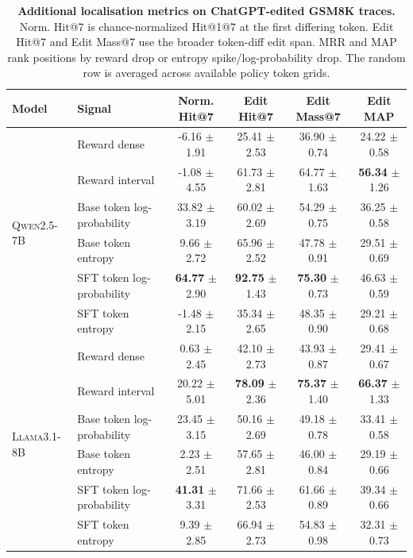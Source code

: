 \begin{table}[t]
\centering
\small
\setlength{\tabcolsep}{4pt}
\caption{\textbf{Additional localisation metrics on ChatGPT-edited GSM8K traces.} Norm. Hit@7 is chance-normalized Hit@1@7 at the first differing token. Edit Hit@7 and Edit Mass@7 use the broader token-diff edit span. MRR and MAP rank positions by reward drop or entropy spike/log-probability drop. The random row is averaged across available policy token grids.}
\label{tab:localisation_chatgpt_step_extra_metrics}
\begin{tabular}{llcccc}
\toprule
\textbf{Model} & \textbf{Signal} & \textbf{Norm. Hit@7} & \textbf{Edit Hit@7} & \textbf{Edit Mass@7} & \textbf{Edit MAP} \\
\midrule
\multirow{6}{*}{\textsc{Qwen2.5-7B}} & Reward dense & -6.16 $\pm$ 1.91 & 25.41 $\pm$ 2.53 & 36.90 $\pm$ 0.74 & 24.22 $\pm$ 0.58 \\
 & Reward interval & -1.08 $\pm$ 4.55 & 61.73 $\pm$ 2.81 & 64.77 $\pm$ 1.63 & \textbf{56.34} $\pm$ 1.26 \\
 & Base token log-probability & 33.82 $\pm$ 3.19 & 60.02 $\pm$ 2.69 & 54.29 $\pm$ 0.75 & 36.25 $\pm$ 0.58 \\
 & Base token entropy & 9.66 $\pm$ 2.72 & 65.96 $\pm$ 2.52 & 47.78 $\pm$ 0.91 & 29.51 $\pm$ 0.69 \\
 & SFT token log-probability & \textbf{64.77} $\pm$ 2.90 & \textbf{92.75} $\pm$ 1.43 & \textbf{75.30} $\pm$ 0.73 & 46.63 $\pm$ 0.59 \\
 & SFT token entropy & -1.48 $\pm$ 2.15 & 35.34 $\pm$ 2.65 & 48.35 $\pm$ 0.90 & 29.21 $\pm$ 0.68 \\
\midrule
\multirow{6}{*}{\textsc{Llama3.1-8B}} & Reward dense & 0.63 $\pm$ 2.45 & 42.10 $\pm$ 2.73 & 43.93 $\pm$ 0.87 & 29.41 $\pm$ 0.67 \\
 & Reward interval & 20.22 $\pm$ 5.01 & \textbf{78.09} $\pm$ 2.36 & \textbf{75.37} $\pm$ 1.40 & \textbf{66.37} $\pm$ 1.33 \\
 & Base token log-probability & 23.45 $\pm$ 3.15 & 50.16 $\pm$ 2.69 & 49.18 $\pm$ 0.78 & 33.41 $\pm$ 0.58 \\
 & Base token entropy & 2.23 $\pm$ 2.51 & 57.65 $\pm$ 2.81 & 46.00 $\pm$ 0.84 & 29.19 $\pm$ 0.66 \\
 & SFT token log-probability & \textbf{41.31} $\pm$ 3.31 & 71.66 $\pm$ 2.53 & 61.66 $\pm$ 0.89 & 39.34 $\pm$ 0.66 \\
 & SFT token entropy & 9.39 $\pm$ 2.85 & 66.94 $\pm$ 2.73 & 54.83 $\pm$ 0.98 & 32.31 $\pm$ 0.73 \\

\end{tabular}
\end{table}
